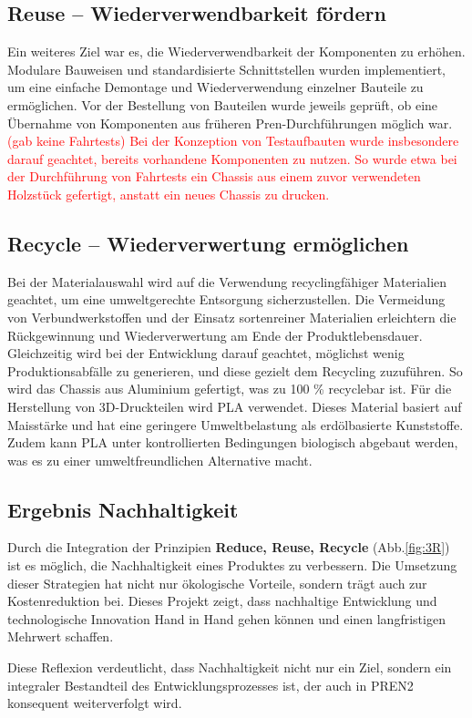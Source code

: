 \documentclass[../main.tex]{subfiles}
\begin{document}
\subsection{Reuse – Wiederverwendbarkeit fördern}

Ein weiteres Ziel war es, die Wiederverwendbarkeit der Komponenten zu erhöhen. Modulare Bauweisen und standardisierte Schnittstellen wurden implementiert, um eine einfache Demontage und Wiederverwendung einzelner Bauteile zu ermöglichen. Vor der Bestellung von Bauteilen wurde jeweils geprüft, ob eine Übernahme von Komponenten aus früheren Pren-Durchführungen möglich war. \textcolor{Red}{(gab keine Fahrtests) Bei der Konzeption von Testaufbauten wurde insbesondere darauf geachtet, bereits vorhandene Komponenten zu nutzen. So wurde etwa bei der Durchführung von Fahrtests ein Chassis aus einem zuvor verwendeten Holzstück gefertigt, anstatt ein neues Chassis zu drucken.}

\subsection{Recycle – Wiederverwertung ermöglichen}

Bei der Materialauswahl wird auf die Verwendung recyclingfähiger Materialien geachtet, um eine umweltgerechte Entsorgung sicherzustellen. Die Vermeidung von Verbundwerkstoffen und der Einsatz sortenreiner Materialien erleichtern die Rückgewinnung und Wiederverwertung am Ende der Produktlebensdauer. Gleichzeitig wird bei der Entwicklung darauf geachtet, möglichst wenig Produktionsabfälle zu generieren, und diese gezielt dem Recycling zuzuführen. So wird das Chassis aus Aluminium gefertigt, was zu 100 \% recyclebar ist. Für die Herstellung von 3D-Druckteilen wird \gls{PLA} verwendet. Dieses Material basiert auf Maisstärke und hat eine geringere Umweltbelastung als erdölbasierte Kunststoffe. Zudem kann PLA unter kontrollierten Bedingungen biologisch abgebaut werden, was es zu einer umweltfreundlichen Alternative macht.

\subsection{Ergebnis Nachhaltigkeit}

Durch die Integration der Prinzipien \textbf{Reduce, Reuse, Recycle} (Abb.\ref{fig:3R}) ist es möglich, die Nachhaltigkeit eines Produktes zu verbessern. Die Umsetzung dieser Strategien hat nicht nur ökologische Vorteile, sondern trägt auch zur Kostenreduktion bei. Dieses Projekt zeigt, dass nachhaltige Entwicklung und technologische Innovation Hand in Hand gehen können und einen langfristigen Mehrwert schaffen.

Diese Reflexion verdeutlicht, dass Nachhaltigkeit nicht nur ein Ziel, sondern ein integraler Bestandteil des Entwicklungsprozesses ist, der auch in PREN2 konsequent weiterverfolgt wird.
\end{document}
